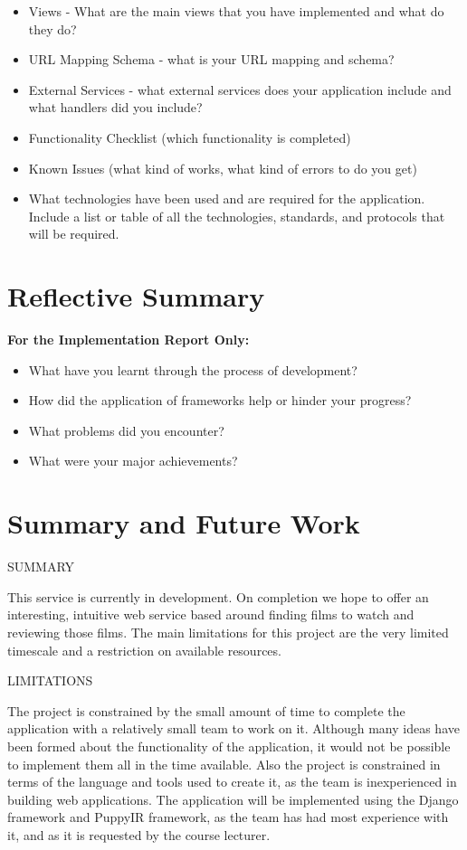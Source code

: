 \documentclass{sig-alt-release2}
\begin{document}
\begin{itemize}
\item Views - What are the main views that you have implemented and what do they do?
\item URL Mapping Schema - what is your URL mapping and schema?
\item External Services  - what external services does your application include and what handlers did you include?
\item	Functionality Checklist (which functionality is completed)
\item	Known Issues (what kind of works, what kind of errors to do you get)
\item What technologies have been used and are required for the application. Include a list or table of all the technologies, standards, and protocols that will be required.
\end{itemize}

\section{Reflective Summary}
{\bf For the Implementation Report Only:}
\begin{itemize}
\item	What have you learnt through the process of development? 
\item	How did the application of frameworks help or hinder your progress? 
\item	What problems did you encounter? 
\item	What were your major achievements?
\end{itemize}

\section{Summary and Future Work}
 
SUMMARY  
 
This service is currently in development. On completion we hope to offer an interesting, intuitive web service based around finding films to watch and reviewing those films. The main limitations for this project are the very limited timescale and a restriction on available resources. 
 
LIMITATIONS 
 
The project is constrained by the small amount of time to complete the application with a relatively small team to work on it. Although many ideas have been formed about the functionality of the application, it would not be possible to implement them all in the time available. Also the project is constrained in terms of the language and tools used to create it, as the team is inexperienced in building web applications. The application will be implemented using the Django framework and PuppyIR framework, as the team has had most experience with it, and as it is requested by the course lecturer. 
 
\end{document}
